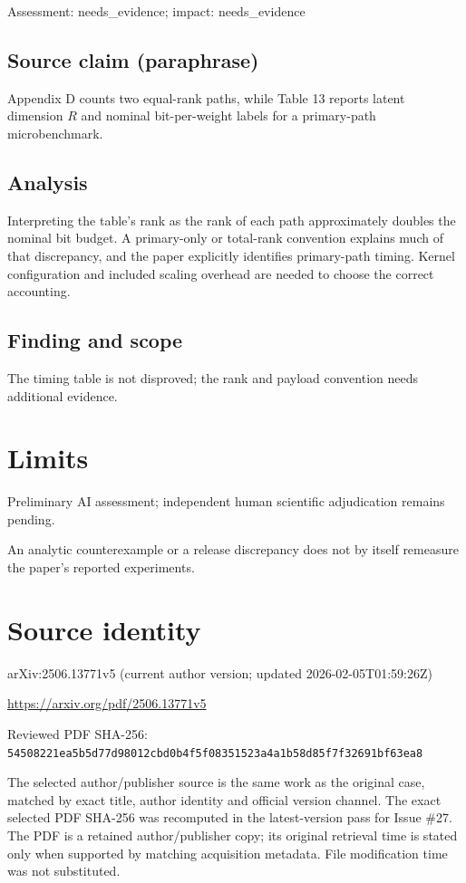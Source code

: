 \documentclass[11pt]{article}
\begin{document}
Assessment: needs\_evidence; impact: needs\_evidence

\subsection*{Source claim (paraphrase)}

Appendix D counts two equal-rank paths, while Table 13 reports latent dimension \(R\) and nominal bit-per-weight labels for a primary-path microbenchmark.

\subsection*{Analysis}

Interpreting the table’s rank as the rank of each path approximately doubles the nominal bit budget. A primary-only or total-rank convention explains much of that discrepancy, and the paper explicitly identifies primary-path timing. Kernel configuration and included scaling overhead are needed to choose the correct accounting.

\subsection*{Finding and scope}

The timing table is not disproved; the rank and payload convention needs additional evidence.

\section*{Limits}

Preliminary AI assessment; independent human scientific adjudication remains pending.\par

An analytic counterexample or a release discrepancy does not by itself remeasure the paper’s reported experiments.\par

\section*{Source identity}

arXiv:2506.13771v5 (current author version; updated 2026-02-05T01:59:26Z)

\url{https://arxiv.org/pdf/2506.13771v5}

Reviewed PDF SHA-256: \nolinkurl{54508221ea5b5d77d98012cbd0b4f5f08351523a4a1b58d85f7f32691bf63ea8}

The selected author/publisher source is the same work as the original case, matched by exact title, author identity and official version channel. The exact selected PDF SHA-256 was recomputed in the latest-version pass for Issue \#27. The PDF is a retained author/publisher copy; its original retrieval time is stated only when supported by matching acquisition metadata. File modification time was not substituted.
\end{document}
